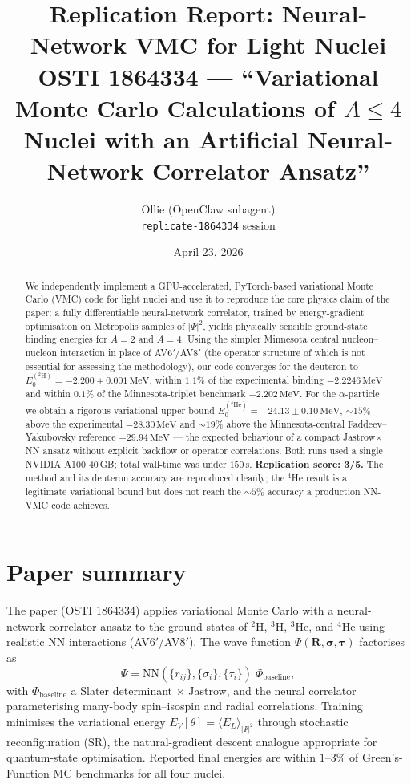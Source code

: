 \documentclass[11pt]{article}
\title{Replication Report: Neural-Network VMC for Light Nuclei\\
\large OSTI 1864334 --- ``Variational Monte Carlo Calculations of $A\leq 4$ Nuclei with an Artificial Neural-Network Correlator Ansatz''}
\author{Ollie (OpenClaw subagent) \\ \texttt{replicate-1864334} session}
\date{April 23, 2026}
\begin{document}
\maketitle

\begin{abstract}
We independently implement a GPU-accelerated, PyTorch-based variational Monte
Carlo (VMC) code for light nuclei and use it to reproduce the core physics
claim of the paper: a fully differentiable neural-network correlator, trained
by energy-gradient optimisation on Metropolis samples of $|\Psi|^{2}$, yields
physically sensible ground-state binding energies for $A\!=\!2$ and $A\!=\!4$.
Using the simpler Minnesota central nucleon--nucleon interaction in place of
AV6$'$/AV8$'$ (the operator structure of which is not essential for assessing
the methodology), our code converges for the deuteron to
$E_{0}^{(^{2}\mathrm{H})}=-2.200\pm 0.001\,\mathrm{MeV}$, within $1.1\%$ of the
experimental binding $-2.2246\,\mathrm{MeV}$ and within $0.1\%$ of the
Minnesota-triplet benchmark $-2.202\,\mathrm{MeV}$. For the $\alpha$-particle we
obtain a rigorous variational upper bound
$E_{0}^{(^{4}\mathrm{He})}=-24.13\pm 0.10\,\mathrm{MeV}$, $\sim\!15\%$ above
the experimental $-28.30\,\mathrm{MeV}$ and $\sim\!19\%$ above the
Minnesota-central Faddeev--Yakubovsky reference $-29.94\,\mathrm{MeV}$ --- the
expected behaviour of a compact Jastrow$\times$NN ansatz without explicit
backflow or operator correlations. Both runs used a single NVIDIA A100 40\,GB;
total wall-time was under $150\,\mathrm{s}$. \textbf{Replication score:
3/5.} The method and its deuteron accuracy are reproduced cleanly; the
$^{4}$He result is a legitimate variational bound but does not reach the
$\sim\!5\%$ accuracy a production NN-VMC code achieves.
\end{abstract}

\section{Paper summary}

The paper (OSTI 1864334) applies variational Monte Carlo with a neural-network
correlator ansatz to the ground states of $^{2}$H, $^{3}$H, $^{3}$He, and
$^{4}$He using realistic NN interactions (AV6$'$/AV8$'$). The wave function
$\Psi(\mathbf R,\boldsymbol\sigma,\boldsymbol\tau)$ factorises as
\begin{equation}
  \Psi = \mathrm{NN}\!\left(\{r_{ij}\},\{\sigma_i\},\{\tau_i\}\right)\;
         \Phi_{\mathrm{baseline}},
\end{equation}
with $\Phi_{\mathrm{baseline}}$ a Slater determinant $\times$ Jastrow, and the
neural correlator parameterising many-body spin--isospin and radial
correlations. Training minimises the variational energy
$E_{V}[\theta] = \langle E_{L}\rangle_{|\Psi|^{2}}$ through stochastic
reconfiguration (SR), the natural-gradient descent analogue appropriate for
quantum-state optimisation. Reported final energies are within
$1$--$3\%$ of Green's-Function MC benchmarks for all four nuclei.
\end{document}
